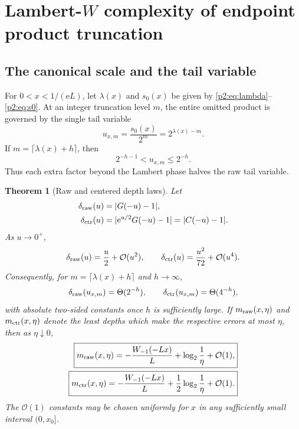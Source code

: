 \documentclass[11pt,oneside]{article}
\numberwithin{equation}{section}
\newtheorem{theorem}{Theorem}[section]
\theoremstyle{definition}
\theoremstyle{remark}
\newcommand{\e}{\mathrm e}
\newcommand{\bigO}{\mathcal O}
\begin{document}
\section{Lambert-$W$ complexity of endpoint product truncation}
\label{p2:sec:Lambert-complexity}

\subsection{The canonical scale and the tail variable}

For $0<x<1/(\e L)$, let $\lambda(x)$ and $s_0(x)$ be given by
\eqref{p2:eq:lambda}--\eqref{p2:eq:s0}.  At an integer truncation level $m$, the entire omitted
product is governed by the single tail variable
\begin{equation}
 u_{x,m}=\frac{s_0(x)}{2^m}=2^{\lambda(x)-m}.
 \label{p2:eq:uxm}
\end{equation}
If $m=\lceil\lambda(x)+h\rceil$, then
\begin{equation}
 2^{-h-1}<u_{x,m}\le2^{-h}.
 \label{p2:eq:u-window}
\end{equation}
Thus each extra factor beyond the Lambert phase halves the raw tail variable.

\begin{theorem}[Raw and centered depth laws]
\label{p2:thm:depth-law}
Let
\begin{align}
 \delta_{\rm raw}(u)&=|G(-u)-1|,\\
 \delta_{\rm ctr}(u)&=|\e^{u/2}G(-u)-1|=|C(-u)-1|.
\end{align}
As $u\to0^+$,
\begin{equation}
 \delta_{\rm raw}(u)=\frac u2+\bigO(u^2),
 \qquad
 \delta_{\rm ctr}(u)=\frac{u^2}{72}+\bigO(u^4).
 \label{p2:eq:tail-orders}
\end{equation}
Consequently, for $m=\lceil\lambda(x)+h\rceil$ and $h\to\infty$,
\begin{equation}
 \delta_{\rm raw}(u_{x,m})=\Theta(2^{-h}),
 \qquad
 \delta_{\rm ctr}(u_{x,m})=\Theta(4^{-h}),
 \label{p2:eq:h-orders}
\end{equation}
with absolute two-sided constants once $h$ is sufficiently large.  If
$m_{\rm raw}(x,\eta)$ and $m_{\rm ctr}(x,\eta)$ denote the least depths which make the
respective errors at most $\eta$, then as $\eta\downarrow0$,
\begin{align}
 \boxed{
 m_{\rm raw}(x,\eta)
 =-\frac{W_{-1}(-Lx)}{L}+\log_2\frac1\eta+\bigO(1),}
 \label{p2:eq:mraw}\\
 \boxed{
 m_{\rm ctr}(x,\eta)
 =-\frac{W_{-1}(-Lx)}{L}+\frac12\log_2\frac1\eta+\bigO(1).}
 \label{p2:eq:mctr}
\end{align}
The $\bigO(1)$ constants may be chosen uniformly for $x$ in any sufficiently small interval
$(0,x_0]$.
\newresult
\end{theorem}
\end{document}

